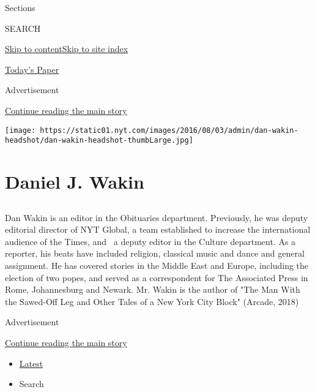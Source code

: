 Sections

SEARCH

\protect\hyperlink{site-content}{Skip to
content}\protect\hyperlink{site-index}{Skip to site index}

\href{https://myaccount.nytimes.com/auth/login?response_type=cookie\&client_id=vi}{}

\href{https://www.nytimes.com/section/todayspaper}{Today's Paper}

Advertisement

\protect\hyperlink{after-top}{Continue reading the main story}

\texttt{[image: https://static01.nyt.com/images/2016/08/03/admin/dan-wakin-headshot/dan-wakin-headshot-thumbLarge.jpg]}

\hypertarget{daniel-j-wakin}{%
\section{Daniel J. Wakin}\label{daniel-j-wakin}}

\subsection{}

Dan Wakin is an editor in the Obituaries department. Previously, he was
deputy editorial director of NYT Global, a team established to increase
the international audience of the Times, and~ a deputy editor in the
Culture department. As a reporter, his beats have included religion,
classical music and dance and general assignment. He has covered stories
in the Middle East and Europe, including the election of two popes, and
served as a correspondent for The Associated Press in Rome, Johannesburg
and Newark. Mr. Wakin is the author of "The Man With the Sawed-Off Leg
and Other Tales of a New York City Block" (Arcade, 2018)

Advertisement

\protect\hyperlink{after-mid1}{Continue reading the main story}

\begin{itemize}
\tightlist
\item
  \protect\hyperlink{stream-panel}{Latest}
\item
  Search
\end{itemize}


